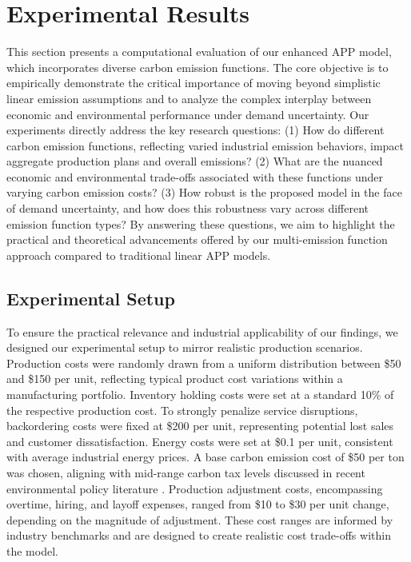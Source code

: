 
\section{Experimental Results}
\label{sec:exp}
This section presents a computational evaluation of our enhanced APP model, which incorporates diverse carbon emission functions. The core objective is to empirically demonstrate the critical importance of moving beyond simplistic linear emission assumptions and to analyze the complex interplay between economic and environmental performance under demand uncertainty.  Our experiments directly address the key research questions: (1) How do different carbon emission functions, reflecting varied industrial emission behaviors, impact aggregate production plans and overall emissions? (2) What are the nuanced economic and environmental trade-offs associated with these functions under varying carbon emission costs? (3) How robust is the proposed model in the face of demand uncertainty, and how does this robustness vary across different emission function types?  By answering these questions, we aim to highlight the practical and theoretical advancements offered by our multi-emission function approach compared to traditional linear APP models.

\subsection{Experimental Setup}
To ensure the practical relevance and industrial applicability of our findings, we designed our experimental setup to mirror realistic production scenarios.  Production costs were randomly drawn from a uniform distribution between \$50 and \$150 per unit, reflecting typical product cost variations within a manufacturing portfolio. Inventory holding costs were set at a standard 10\% of the respective production cost. To strongly penalize service disruptions, backordering costs were fixed at \$200 per unit, representing potential lost sales and customer dissatisfaction. Energy costs were set at \$0.1 per unit, consistent with average industrial energy prices. A base carbon emission cost of \$50 per ton was chosen, aligning with mid-range carbon tax levels discussed in recent environmental policy literature \citep{cariou2019}. Production adjustment costs, encompassing overtime, hiring, and layoff expenses, ranged from \$10 to \$30 per unit change, depending on the magnitude of adjustment.  These cost ranges are informed by industry benchmarks and are designed to create realistic cost trade-offs within the model.

